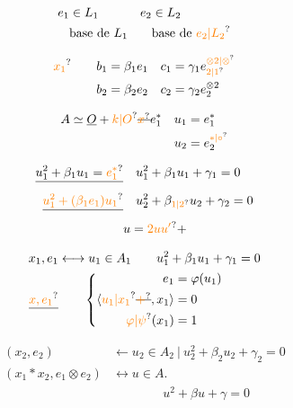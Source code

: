 \[
\begin{aligned}
e_1&\in L_1 & e_2&\in L_2\\
&\text{base de }L_1 &&\text{base de }\unsure{e_2|L_2}
\end{aligned}
\]

\[
\begin{aligned}
\unsure{x_1}\qquad b_1&=\beta_1e_1 &c_1&=\gamma_1e_{\unsure{2|1}}^{\unsure{\otimes2|\otimes}}\\
b_2&=\beta_2e_2 &c_2&=\gamma_2 e_2^{\otimes2}
\end{aligned}
\]

\[
\begin{aligned}
 A&\simeq\underline O+\unsure{k|O}\deleted{\unsure{x}}e_1^* &
 u_1&=e_1^*\\
 &&u_2&=e_2^{\unsure{*|\circ}}
\end{aligned}
\]

\[
\begin{aligned}
\deleted{u_1^2+\beta_1u_1=\unsure{e_1^*}}&\quad u_1^2+\beta_1u_1+\gamma_1=0\\
\deleted{\unsure{u_1^2+(\beta_1 e_1)u_1}}&\quad u_2^2+\beta_{\unsure{1|2}}u_2+\gamma_2=0\\
&u=\unsure{2uu'}+
\end{aligned}
\]

\[
\begin{aligned}
 x_1,e_1&\longleftrightarrow u_1\in A_1 \qquad u_1^2+\beta_1u_1+\gamma_1=0\\
 \deleted{\unsure{x,e_1}}&\qquad
 \left\{\begin{aligned}
 e_1&=\varphi(u_1)\\
 \langle\unsure{u_1|x_1}\deleted{\unsure{+}},x_1\rangle&=0\\
 \unsure{\varphi|\psi}(x_1)&=1
 \end{aligned}\right.
\end{aligned}
\]

\[
\begin{aligned}
(x_2,e_2)&\longleftarrow u_2\in A_2\ \big|\ u_2^2+\beta_2u_2+\gamma_2=0\\
(x_1*x_2,e_1\otimes e_2)&\longleftrightarrow u\in A.\\
&\hspace{4em}u^2+\beta u+\gamma=0
\end{aligned}
\]


